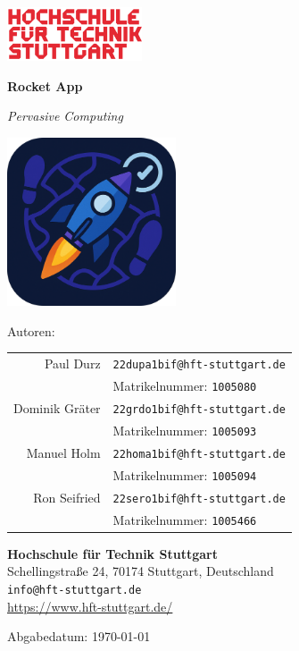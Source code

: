 \documentclass[11pt,a4paper]{article}
\newcommand{\email}[1]{\texttt{#1}}
\newcommand{\id}[1]{\texttt{#1}}
\begin{document}
\begin{titlepage}
    \begin{flushright}
        \includegraphics[width=4cm]{images/Logo-HFT-Stuttgart.png}
    \end{flushright}
    \vspace{0.5cm}

    \begin{center}
        {\Huge \textbf{Rocket App} \par}
        \vspace{0.3cm}
        {\LARGE \textit{Pervasive Computing} \par}
        \vspace{1.5cm}
        \includegraphics[width=5cm]{images/AppIcon.png}
        \vspace{1.5cm}

        {\Large Autoren: \par}
        \vspace{0.3cm}
        \begin{tabular}{rl}
            Paul Durz      & \email{22dupa1bif@hft-stuttgart.de} \\
                          & Matrikelnummer: \id{1005080} \\
            Dominik Gräter & \email{22grdo1bif@hft-stuttgart.de} \\
                          & Matrikelnummer: \id{1005093} \\
            Manuel Holm    & \email{22homa1bif@hft-stuttgart.de} \\
                          & Matrikelnummer: \id{1005094} \\
            Ron Seifried   & \email{22sero1bif@hft-stuttgart.de} \\
                          & Matrikelnummer: \id{1005466} \\
        \end{tabular}
        \vspace{1.5cm}

        \textbf{Hochschule für Technik Stuttgart} \\
        Schellingstraße 24, 70174 Stuttgart, Deutschland \\
        \email{info@hft-stuttgart.de} \\
        \url{https://www.hft-stuttgart.de/}

        \vfill
        \large Abgabedatum: \today \\
    \end{center}
\end{titlepage}
\end{document}
